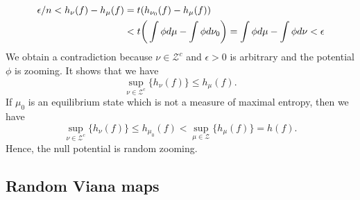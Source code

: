 \documentclass[12pt,a4paper]{amsart}
\theoremstyle{plain}
\begin{document}
	\begin{align*}
		\epsilon/n < h_{\nu}(f) - h_{\mu}(f) &= t(h_{\nu_{0}}(f) - h_{\mu}(f)) \\
		& < t\bigg{(}\int \phi d\mu - \int \phi d\nu_{0}\bigg{)} = \int \phi d\mu - \int \phi d\nu < \epsilon\\
	\end{align*}
	We obtain a contradiction because $\nu \in \mathcal{Z}^{c}$ and $\epsilon > 0$ is arbitrary and the potential $\phi$ is zooming. It shows that we have
	\[
	\sup_{\nu \in \mathcal{Z}^{c}}\{h_{\nu}(f)\} \leq h_{\mu}(f).
	\]
	If $\mu_{0}$ is an equilibrium state which is not a measure of maximal entropy, then we have
	\[
	\sup_{\nu \in \mathcal{Z}^{c}}\{h_{\nu}(f)\} \leq h_{\mu_{0}}(f) < \sup_{\mu \in \mathcal{Z}}\{h_{\mu}(f)\} = h(f).
	\]
	Hence, the null potential is random zooming.
	
	
	
	
	\subsection{Random Viana maps}
	
	
\end{document}

